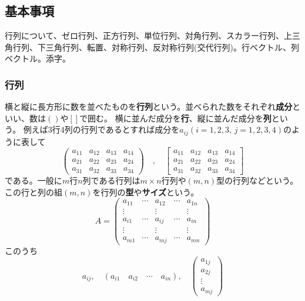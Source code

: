 \documentclass[10pt]{jsarticle}
\numberwithin{equation}{section}%
\begin{document}
\subsection{基本事項}
行列について、ゼロ行列、正方行列、単位行列、対角行列、スカラー行列、上三角行列、下三角行列、転置、対称行列、反対称行列(交代行列)。行ベクトル、列ベクトル。添字。
\subsubsection{行列}
横と縦に長方形に数を並べたものを{\bf 行列}という。並べられた数をそれぞれ{\bf 成分}といい、数は$()$や$[]$で囲む。
横に並んだ成分を{\bf 行}、縦に並んだ成分を{\bf 列}という。
例えば3行4列の行列であるとすれば成分を$a_{ij}(i=1,2,3,\, j=1,2,3,4)$のように表して
\begin{equation}\left(
 \begin{matrix}
    a_{11} & a_{12} & a_{13} & a_{14} \\
    a_{21} & a_{22} & a_{23} & a_{24} \\
    a_{31} & a_{32} & a_{33} & a_{34} 
  \end{matrix}\right) \quad , \quad \left[
    \begin{matrix}
      a_{11} & a_{12} & a_{13} & a_{14} \\
      a_{21} & a_{22} & a_{23} & a_{24} \\
      a_{31} & a_{32} & a_{33} & a_{34} 
    \end{matrix}\right]
\end{equation}
である。一般に$m$行$n$列である行列は$m\times n$行列や$(m,n)$型の行列などという。この行と列の組$(m,n)$を行列の{\bf 型}や{\bf サイズ}という。
\begin{equation}
  \label{gyoretu}  A=
  \left(
 \begin{matrix}
    a_{11} & \cdots & a_{12} & \cdots & a_{1n} \\
    \vdots &        & \vdots &        & \vdots \\
    a_{i1} & \cdots & a_{ij} & \cdots & a_{in}\\ 
    \vdots &        & \vdots &        & \vdots \\
    a_{m1} & \cdots & a_{mj} & \cdots & a_{mn} 
  \end{matrix}\right)
\end{equation}
このうち 
\begin{equation}
  a_{ij} , \quad (a_{i1} \quad a_{i2} \quad \cdots \quad a_{in} ),\quad  \left( \begin{matrix}
    a_{1j}\\
    a_{2j}\\
    \vdots\\
    a_{mj}
  \end{matrix}\right)
\end{equation}
\end{document}
